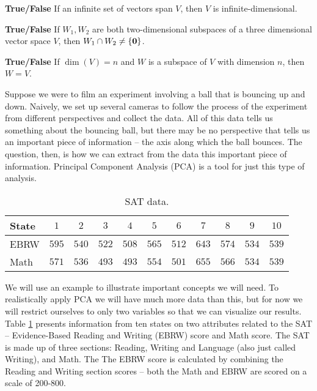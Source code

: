 \item \textbf{True/False} If an infinite set of vectors span $V$, then $V$ is infinite-dimensional.

\item \textbf{True/False} If $W_1, W_2$ are both two-dimensional subspaces of a three dimensional vector space $V$, then $W_1\cap W_2\neq \{\mathbf{0} \}$.

\item \textbf{True/False} If $\dim(V)=n$ and $W$ is a subspace of $V$ with dimension $n$, then $W=V$.




\ea

\ee


\label{sec:proj_pca}

Suppose we were to film an experiment involving a ball that is bouncing up and down. Naively, we set up several cameras to follow the process of the experiment from different perspectives and collect the data. All of this data tells us something about the bouncing ball, but there may be no perspective that tells us an important piece of information -- the axis along which the ball bounces. The question, then, is how we can extract from the data this important piece of information. Principal Component Analysis (PCA) is a tool for just this type of analysis. 


\begin{table}[ht]
\begin{center}
\begin{tabular}{lcccccccccc} 
State			&$1$	 &$2$ &$3$ &$4$ &$5$ &$6$ &$7$ &$8$ &$9$ &$10$ \\ \hline
EBRW		&$595$ &$540$ &$522$ &$508$ &$565$ &$512$ &$643$ &$574$ &$534$ &$539$ \\
Math			&$571$ &$536$ &$493$ &$493$ &$554$ &$501$ &$655$ &$566$ &$534$ &$539$ 
\end{tabular}
\caption{SAT data.}
\label{T:PCA_SAT_2}
\end{center}
\end{table}
We will use an example to illustrate important concepts we will need. To realistically apply PCA we will have much more data than this, but for now we will restrict ourselves to only two variables so that we can visualize our results. Table \ref{T:PCA_SAT_2} presents information from ten states on two attributes related to the SAT -- Evidence-Based Reading and Writing (EBRW) score and Math score. The SAT is made up of three sections: Reading, Writing and Language (also just called Writing), and Math. The The EBRW score is calculated by combining the Reading and Writing section scores -- both the Math and EBRW are scored on a scale of 200-800.

